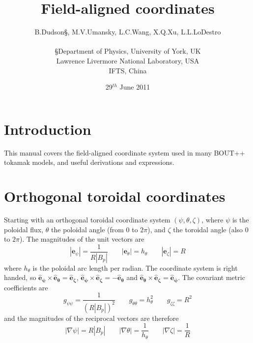 \documentclass[12pt]{article}
\newcommand{\hthe}{\ensuremath{h_\theta}}
\begin{document}
\title{Field-aligned coordinates}
\author{B.Dudson\S, M.V.Umansky\dag, L.C.Wang\ddag, X.Q.Xu\dag, L.L.LoDestro\dag \\
\\
  \S Department of Physics, University of York, UK \\
  \dag Lawrence Livermore National Laboratory, USA \\
  \ddag IFTS, China}
\date{29$^{th}$ June 2011}
\maketitle

\tableofcontents

\section{Introduction}

This manual covers the field-aligned coordinate system used in many BOUT++
tokamak models, and useful derivations and expressions.


\section{Orthogonal toroidal coordinates}
\label{sec:coordinates}

Starting with an orthogonal toroidal coordinate system $\left(\psi, \theta, \zeta\right)$, where $\psi$ is the poloidal flux, $\theta$ the poloidal angle (from $0$ to $2\pi$), and $\zeta$ the toroidal angle (also $0$ to $2\pi$). The magnitudes of the unit vectors are
\begin{equation}
\left|\mathbf{e}_\psi\right| = \frac{1}{R\left|B_p\right|} \qquad
\left|\mathbf{e}_\theta\right| = \hthe \qquad
\left|\mathbf{e}_\zeta\right| = R
\label{eq:fluxmags}
\end{equation}
where $\hthe$ is the poloidal arc length per radian. 
The coordinate system is right handed, so $\mathbf{\hat{e}_\psi\times\hat{e}_\theta = \hat{e}_\zeta}$,
$\mathbf{\hat{e}_\psi\times\hat{e}_\zeta = -\hat{e}_\theta}$ and $\mathbf{\hat{e}_\theta\times\hat{e}_\zeta = \hat{e}_\psi}$. The covariant metric coefficients are
\begin{equation}
g_{\psi\psi} = \frac{1}{\left(R\left|B_p\right|\right)^2} \qquad
g_{\theta\theta} = h_\theta^2 \qquad
g_{\zeta\zeta} = R^2
\end{equation}
and the magnitudes of the reciprocal vectors are therefore
\begin{equation}
\left|\nabla\psi\right| = R\left|B_p\right| \qquad
\left|\nabla\theta\right| = \frac{1}{h_\theta} \qquad
\left|\nabla\zeta\right| = \frac{1}{R}
\label{eq:fluxmags2}
\end{equation}
\end{document}
